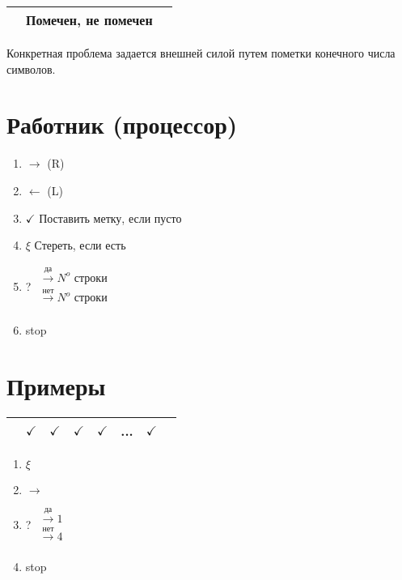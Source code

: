 \documentclass[a4paper, 14pt]{report}
\begin{document}
    \hfill

    \begin{tabular}{c|c|c}
        \hline
        & Помечен, не помечен & \\
        \hline
    \end{tabular}

    \hfill

    Конкретная проблема задается внешней силой путем пометки конечного числа символов.

    \section{Работник (процессор)}

    \begin{enumerate}
        \item $\to$  (R)
        \item $\leftarrow$ (L)
        \item $\checkmark$ Поставить метку, если пусто
        \item $\xi$ Стереть, если есть
        \item ? $\begin{matrix}
                \overset{\text{да}}{\to} N^o \text{ строки} \\
                \overset{\text{нет}}{\to} N^o \text{ строки} \\
                \end{matrix}$
        \item stop
    \end{enumerate}

    \section{Примеры}

    \begin{tabular}{c|c|c|c|c|c|c|c}
        \hline
        & $\checkmark$ & $\checkmark$ & $\checkmark$ & $\checkmark$ & ... & $\checkmark$ &  \\
        \hline
    \end{tabular}

    \begin{enumerate}
        \item $\xi$
        \item $\to$
        \item ? $\begin{matrix}
                \overset{\text{да}}{\to} 1 \\
                \overset{\text{нет}}{\to} 4 \\
                \end{matrix}$
        \item stop
    \end{enumerate}
\end{document}
